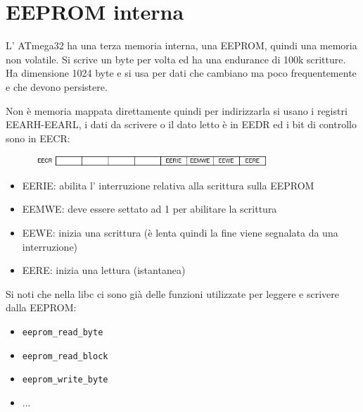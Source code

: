 \section{EEPROM interna}
L' ATmega32 ha una terza memoria interna, una EEPROM, quindi una memoria non volatile.
Si scrive un byte per volta ed ha una endurance di 100k scritture.
Ha dimensione 1024 byte e si usa per dati che cambiano ma poco frequentemente e che devono persistere.

Non è memoria mappata direttamente quindi per indirizzarla si usano i registri EEARH-EEARL, i dati da scrivere o il dato letto è in EEDR ed i bit di controllo sono in EECR:
\begin{figure}[H]
    \centering
    \includegraphics[width=330px]{images/29_EEPROM_interna/EECR.png}
\end{figure}
\begin{itemize}
    \item EERIE: abilita l' interruzione relativa alla scrittura sulla EEPROM
    \item EEMWE: deve essere settato ad 1 per abilitare la scrittura
    \item EEWE: inizia una scrittura (è lenta quindi la fine viene segnalata da una interruzione)
    \item EERE: inizia una lettura (istantanea)
\end{itemize}

Si noti che nella libc ci sono già delle funzioni utilizzate per leggere e scrivere dalla EEPROM:
\begin{itemize}
    \item \verb{eeprom_read_byte{
    \item \verb{eeprom_read_block{
    \item \verb{eeprom_write_byte{
    \item ...
\end{itemize}

